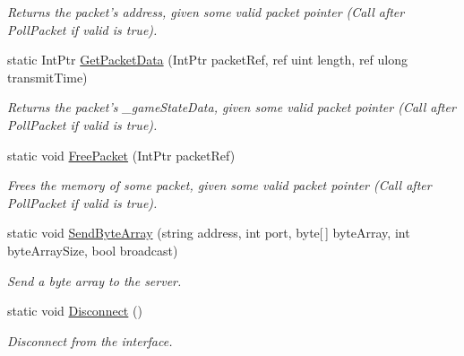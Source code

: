 \begin{DoxyCompactItemize}
\begin{DoxyCompactList}\small\item\em Returns the packet's address, given some valid packet pointer (Call after Poll\-Packet if valid is true). \end{DoxyCompactList}\item 
\hypertarget{class_champ_net_plugin_1_1_network_plugin_a11adc3498dc1678c40249a88710887ae}{static Int\-Ptr \hyperlink{class_champ_net_plugin_1_1_network_plugin_a11adc3498dc1678c40249a88710887ae}{Get\-Packet\-Data} (Int\-Ptr packet\-Ref, ref uint length, ref ulong transmit\-Time)}\label{class_champ_net_plugin_1_1_network_plugin_a11adc3498dc1678c40249a88710887ae}

\begin{DoxyCompactList}\small\item\em Returns the packet's \-\_\-game\-State\-Data, given some valid packet pointer (Call after Poll\-Packet if valid is true). \end{DoxyCompactList}\item 
\hypertarget{class_champ_net_plugin_1_1_network_plugin_a2aa2f283d94acae96d17fac1d84844f4}{static void \hyperlink{class_champ_net_plugin_1_1_network_plugin_a2aa2f283d94acae96d17fac1d84844f4}{Free\-Packet} (Int\-Ptr packet\-Ref)}\label{class_champ_net_plugin_1_1_network_plugin_a2aa2f283d94acae96d17fac1d84844f4}

\begin{DoxyCompactList}\small\item\em Frees the memory of some packet, given some valid packet pointer (Call after Poll\-Packet if valid is true). \end{DoxyCompactList}\item 
\hypertarget{class_champ_net_plugin_1_1_network_plugin_a61ed4431f2d87b66b7cc1a66287225da}{static void \hyperlink{class_champ_net_plugin_1_1_network_plugin_a61ed4431f2d87b66b7cc1a66287225da}{Send\-Byte\-Array} (string address, int port, byte\mbox{[}$\,$\mbox{]} byte\-Array, int byte\-Array\-Size, bool broadcast)}\label{class_champ_net_plugin_1_1_network_plugin_a61ed4431f2d87b66b7cc1a66287225da}

\begin{DoxyCompactList}\small\item\em Send a byte array to the server. \end{DoxyCompactList}\item 
\hypertarget{class_champ_net_plugin_1_1_network_plugin_a8fd4e2f13e4abffc393cb1a354b3489a}{static void \hyperlink{class_champ_net_plugin_1_1_network_plugin_a8fd4e2f13e4abffc393cb1a354b3489a}{Disconnect} ()}\label{class_champ_net_plugin_1_1_network_plugin_a8fd4e2f13e4abffc393cb1a354b3489a}

\begin{DoxyCompactList}\small\item\em Disconnect from the interface. \end{DoxyCompactList}\end{DoxyCompactItemize}
